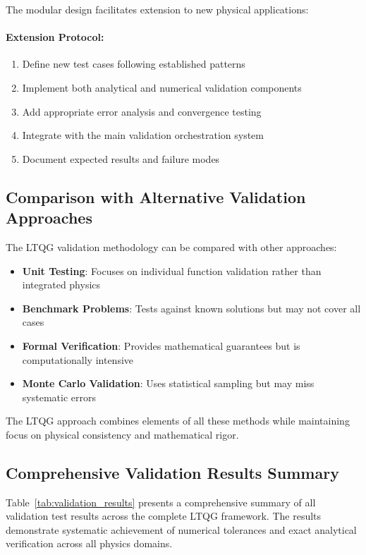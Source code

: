 The modular design facilitates extension to new physical applications:

\paragraph{Extension Protocol:}
\begin{enumerate}
\item Define new test cases following established patterns
\item Implement both analytical and numerical validation components
\item Add appropriate error analysis and convergence testing
\item Integrate with the main validation orchestration system
\item Document expected results and failure modes
\end{enumerate}

\subsection{Comparison with Alternative Validation Approaches}
\label{subsec:alternative_validation}

The LTQG validation methodology can be compared with other approaches:

\begin{itemize}
\item \textbf{Unit Testing}: Focuses on individual function validation rather than integrated physics
\item \textbf{Benchmark Problems}: Tests against known solutions but may not cover all cases
\item \textbf{Formal Verification}: Provides mathematical guarantees but is computationally intensive
\item \textbf{Monte Carlo Validation}: Uses statistical sampling but may miss systematic errors
\end{itemize}

The LTQG approach combines elements of all these methods while maintaining focus on physical consistency and mathematical rigor.

\subsection{Comprehensive Validation Results Summary}
\label{subsec:comprehensive_validation_summary}

Table~\ref{tab:validation_results} presents a comprehensive summary of all validation test results across the complete LTQG framework. The results demonstrate systematic achievement of numerical tolerances and exact analytical verification across all physics domains.

